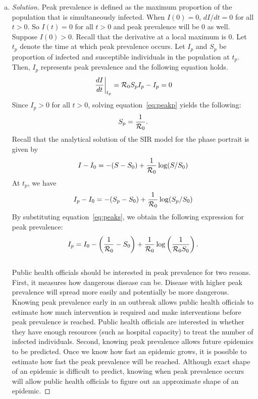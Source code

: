 \documentclass[12pt]{article}
\begin{document}
\basicSIRanalIntro
\begin{enumerate}[(a)]
\item \basicSIRanalQa

{\color{blue}
\begin{proof}[Solution]
Peak prevalence is defined as the maximum proportion of the population that is simultaneously infected. 
When $I(0) = 0$, $dI/dt = 0$ for all $t > 0$. So $I(t) = 0$ for all $t > 0$ and peak prevalence will be 0 as well.\\

Suppose $I(0) > 0$.
Recall that the derivative at a local maximum is 0. Let $t_p$ denote the time at which peak prevalence occurs. Let ${I}_p$ and ${S}_p$ be proportion of infected and susceptible individuals in the population at $t_p$. Then, ${I}_p$ represents peak prevalence and the following equation holds.
\begin{equation}
\left.\frac{dI}{dt}\right|_{t_p} = {\cal R}_0 S_p I_p - I_p = 0
\label{eq:peakp}
\end{equation}
Since $I_p > 0$ for all $t>0$, solving equation~\eqref{eq:peakp} yields the following:
\begin{equation}
S_p = \frac{1}{{\cal R}_0}.
\label{eq:peaks}
\end{equation}
Recall that the analytical solution of the SIR model for the phase portrait is given by
\begin{equation*}
I - I_0 = -(S - S_0) + \frac{1}{{\cal R}_0} \log (S/S_0)
\end{equation*}
At $t_p$, we have
\begin{equation*}
I_p - I_0 = -(S_p - S_0) + \frac{1}{{\cal R}_0} \log (S_p/S_0)
\end{equation*}
By substituting equation~\eqref{eq:peaks}, we obtain the following expression for peak prevalence:
\begin{equation*}
I_p = I_0 - \left(\frac{1}{{\cal R}_0} - S_0\right) + \frac{1}{{\cal R}_0} \log \left( \frac{1}{{\cal R}_0 S_0}\right).
\end{equation*}
\\
Public health officials should be interested in peak prevalence for two reaons.
First, it measures how dangerous disease can be. 
Disease with higher peak prevalence will spread more easily and potentially be more dangerous.
Knowing peak prevalence early in an outbreak allows public health officials to estimate how much intervention is required and make interventions before peak prevalence is reached. Public health officials are interested in whether they have enough resources (such as hospital capacity) to treat the number of infected individuals.
Second, knowing peak prevalence allows future epidemics to be predicted.
Once we know how fast an epidemic grows, it is possible to estimate how fast the peak prevalence will be reached. 
Although exact shape of an epidemic is difficult to predict, knowing when peak prevalence occurs will allow public health officials to figure out an approximate shape of an epidemic.
\end{proof}
}


\end{enumerate}
\end{document}
